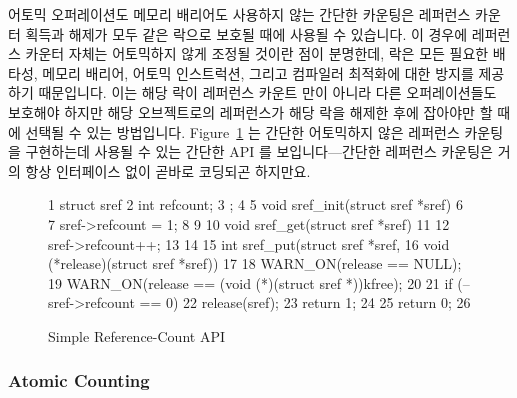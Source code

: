 어토믹 오퍼레이션도 메모리 배리어도 사용하지 않는 간단한 카운팅은 레퍼런스
카운터 획득과 해제가 모두 같은 락으로 보호될 때에 사용될 수 있습니다.
이 경우에 레퍼런스 카운터 자체는 어토믹하지 않게 조정될 것이란 점이 분명한데,
락은 모든 필요한 배타성, 메모리 배리어, 어토믹 인스트럭션, 그리고 컴파일러
최적화에 대한 방지를 제공하기 때문입니다.
이는 해당 락이 레퍼런스 카운트 만이 아니라 다른 오퍼레이션들도 보호해야 하지만
해당 오브젝트로의 레퍼런스가 해당 락을 해제한 후에 잡아야만 할 때에 선택될 수
있는 방법입니다.
Figure~\ref{fig:together:Simple Reference-Count API} 는 간단한 어토믹하지 않은
레퍼런스 카운팅을 구현하는데 사용될 수 있는 간단한 API 를 보입니다---간단한
레퍼런스 카운팅은 거의 항상 인터페이스 없이 곧바로 코딩되곤 하지만요.
\iffalse

Simple counting, with neither atomic operations nor memory barriers,
can be used when the reference-counter acquisition and release are
both protected by the same lock.
In this case, it should be clear that the reference count itself
may be manipulated non-atomically, because the lock provides any
necessary exclusion, memory barriers, atomic instructions, and disabling
of compiler optimizations.
This is the method of choice when the lock is required to protect
other operations in addition to the reference count, but where
a reference to the object must be held after the lock is released.
Figure~\ref{fig:together:Simple Reference-Count API} shows a simple
API that might be used to implement simple non-atomic reference
counting---although simple reference counting is almost always
open-coded instead.
\fi

\begin{figure}[tbp]
{ \scriptsize
\begin{verbbox}
  1 struct sref {
  2   int refcount;
  3 };
  4
  5 void sref_init(struct sref *sref)
  6 {
  7   sref->refcount = 1;
  8 }
  9
 10 void sref_get(struct sref *sref)
 11 {
 12   sref->refcount++;
 13 }
 14
 15 int sref_put(struct sref *sref,
 16              void (*release)(struct sref *sref))
 17 {
 18   WARN_ON(release == NULL);
 19   WARN_ON(release == (void (*)(struct sref *))kfree);
 20
 21   if (--sref->refcount == 0) {
 22     release(sref);
 23     return 1;
 24   }
 25   return 0;
 26 }
\end{verbbox}
}
\centering
\theverbbox
\caption{Simple Reference-Count API}
\label{fig:together:Simple Reference-Count API}
\end{figure}

\subsubsection{Atomic Counting}
\label{sec:together:Atomic Counting}

